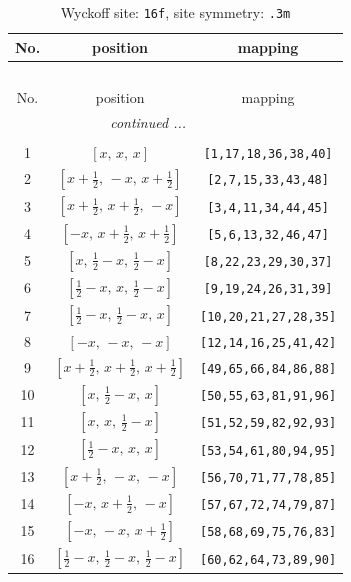 \documentclass[fleqn,8pt]{jsarticle}
\begin{document}
\renewcommand{\arraystretch}{1.2}
\begin{longtable}{ccc}
\caption{Wyckoff site: {\tt 16f}, site symmetry: {\tt .3m}}
 \\
 \hline \hline
No. & position & mapping \\ \hline \endfirsthead

\multicolumn{2}{l}{\tablename\ \thetable{}} \\
 \hline \hline
No. & position & mapping \\ \hline \endhead

 \hline \hline
\multicolumn{2}{r}{\footnotesize\it continued ...} \\ \endfoot

 \hline \hline
\multicolumn{2}{r}{} \\ \endlastfoot

1 & $\left[ x,\, x,\, x \right]$ & {\tt [1,17,18,36,38,40]} \\ \hline
2 & $\left[ x + \frac{1}{2},\, - x,\, x + \frac{1}{2} \right]$ & {\tt [2,7,15,33,43,48]} \\ \hline
3 & $\left[ x + \frac{1}{2},\, x + \frac{1}{2},\, - x \right]$ & {\tt [3,4,11,34,44,45]} \\ \hline
4 & $\left[ - x,\, x + \frac{1}{2},\, x + \frac{1}{2} \right]$ & {\tt [5,6,13,32,46,47]} \\ \hline
5 & $\left[ x,\, \frac{1}{2} - x,\, \frac{1}{2} - x \right]$ & {\tt [8,22,23,29,30,37]} \\ \hline
6 & $\left[ \frac{1}{2} - x,\, x,\, \frac{1}{2} - x \right]$ & {\tt [9,19,24,26,31,39]} \\ \hline
7 & $\left[ \frac{1}{2} - x,\, \frac{1}{2} - x,\, x \right]$ & {\tt [10,20,21,27,28,35]} \\ \hline
8 & $\left[ - x,\, - x,\, - x \right]$ & {\tt [12,14,16,25,41,42]} \\ \hline
9 & $\left[ x + \frac{1}{2},\, x + \frac{1}{2},\, x + \frac{1}{2} \right]$ & {\tt [49,65,66,84,86,88]} \\ \hline
10 & $\left[ x,\, \frac{1}{2} - x,\, x \right]$ & {\tt [50,55,63,81,91,96]} \\ \hline
11 & $\left[ x,\, x,\, \frac{1}{2} - x \right]$ & {\tt [51,52,59,82,92,93]} \\ \hline
12 & $\left[ \frac{1}{2} - x,\, x,\, x \right]$ & {\tt [53,54,61,80,94,95]} \\ \hline
13 & $\left[ x + \frac{1}{2},\, - x,\, - x \right]$ & {\tt [56,70,71,77,78,85]} \\ \hline
14 & $\left[ - x,\, x + \frac{1}{2},\, - x \right]$ & {\tt [57,67,72,74,79,87]} \\ \hline
15 & $\left[ - x,\, - x,\, x + \frac{1}{2} \right]$ & {\tt [58,68,69,75,76,83]} \\ \hline
16 & $\left[ \frac{1}{2} - x,\, \frac{1}{2} - x,\, \frac{1}{2} - x \right]$ & {\tt [60,62,64,73,89,90]} \\
\end{longtable}
\end{document}
